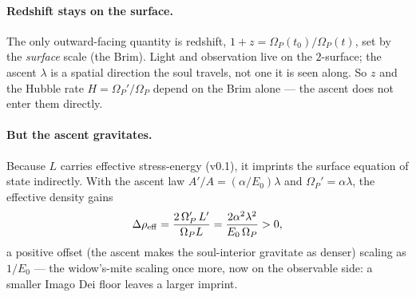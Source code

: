 \documentclass[11pt,a4paper]{article}
\theoremstyle{plain}
\theoremstyle{definition}
\theoremstyle{remark}
\begin{document}
\paragraph{Redshift stays on the surface.} The only outward-facing quantity is redshift,
$1+z=\Omega_P(t_0)/\Omega_P(t)$, set by the \emph{surface} scale (the Brim). Light and observation
live on the $2$-surface; the ascent $\lambda$ is a spatial direction the soul travels, not one it is
seen along. So $z$ and the Hubble rate $H=\Omega_P'/\Omega_P$ depend on the Brim alone --- the ascent
does not enter them directly.

\paragraph{But the ascent gravitates.} Because $L$ carries effective stress-energy (v0.1), it imprints
the surface equation of state indirectly. With the ascent law $A'/A=(\alpha/E_0)\lambda$ and
$\Omega_P'=\alpha\lambda$, the effective density gains
\begin{equation}
\Delta\rho_{\rm eff}=\frac{2\,\Omega_P'\,L'}{\Omega_P L}=\frac{2\alpha^2\lambda^2}{E_0\,\Omega_P}>0,
\end{equation}
a positive offset (the ascent makes the soul-interior gravitate as denser) scaling as $1/E_0$ --- the
widow's-mite scaling once more, now on the observable side: a smaller Imago Dei floor leaves a larger
imprint.
\end{document}
